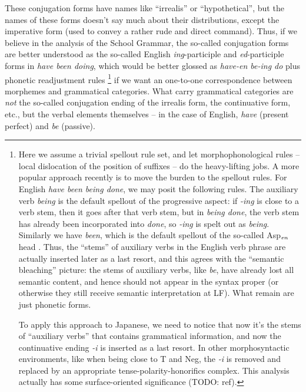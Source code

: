 \documentclass[UTF8, a4paper, oneside, scheme=plain]{ctexart}
\newcommand{\corpus}[1]{\emph{#1}}
\begin{document}
These conjugation forms have names like ``irrealis'' or ``hypothetical'',
but the names of these forms doesn't say much about their distributions,
except the imperative form (used to convey a rather rude and direct command).
Thus, if we believe in the analysis of the School Grammar,
the so-called conjugation forms are better understood as the 
so-called English \corpus{ing}-participle and \corpus{ed}-participle forms 
in \corpus{have been doing},
which would be better glossed as 
\corpus{have-en be-ing do} plus phonetic readjustment rules%
\footnote{
    Here we assume a trivial spellout rule set,
    and let morphophonological rules -- local dislocation of the position of suffixes --
    do the heavy-lifting jobs.
    A more popular approach recently is to move the burden to the spellout rules.
    For English \corpus{have been being done},
    we may posit the following rules.
    The auxiliary verb \corpus{being} is the default spellout of the progressive aspect:
    if \corpus{-ing} is close to a verb stem, then it goes after that verb stem,
    but in \corpus{being done}, the verb stem has already been incorporated into \corpus{done},
    so \corpus{-ing} is spelt out as \corpus{being}.
    Similarly we have \corpus{been}, which is the default spellout of the so-called 
    Asp$_{\text{\corpus{en}}}$ head \citep{ramchand2014152}.
    Thus, the ``stems'' of auxiliary verbs in the English verb phrase 
    are actually inserted later as a last resort,
    and this agrees with the ``semantic bleaching'' picture:
    the stems of auxiliary verbs, like \corpus{be}, 
    have already lost all semantic content,
    and hence should not appear in the syntax proper 
    (or otherwise they still receive semantic interpretation at LF).
    What remain are just phonetic forms.

    To apply this approach to Japanese,
    we need to notice that now it's the stems of ``auxiliary verbs'' that contains grammatical information,
    and now the continuative ending \corpus{-i} is inserted as a last resort.
    In other morphosyntactic environments,
    like when being close to T and Neg,
    the \corpus{-i} is removed and replaced by an appropriate tense-polarity-honorifics complex.
    This analysis actually has some surface-oriented significance (TODO: ref).
}\label{fn:spellout-based}
if we want an one-to-one correspondence between morphemes and grammatical categories.
What carry grammatical categories are \emph{not} the so-called conjugation ending of 
the irrealis form, the continuative form, etc.,
but the verbal elements themselves -- 
in the case of English,
\corpus{have} (present perfect) and \corpus{be} (passive).
\end{document}
